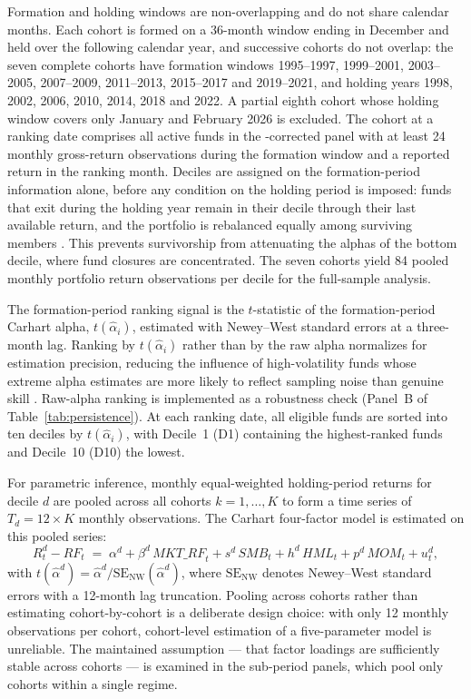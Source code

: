 \documentclass[12pt, oneside]{report}
\renewcommand{\mathrm}[1]{\text{#1}}%
\begin{document}
Formation and holding windows are non-overlapping and do not share
calendar months. Each cohort is formed on a 36-month window ending in
December and held over the following calendar year, and successive cohorts
do not overlap: the seven complete cohorts have formation windows
1995--1997, 1999--2001, 2003--2005, 2007--2009, 2011--2013, 2015--2017 and
2019--2021, and holding years 1998, 2002, 2006, 2010, 2014, 2018 and 2022.
A partial eighth cohort whose holding window covers only January and
February 2026 is excluded. The cohort at a ranking date comprises all
active funds in the \textcite{Evans2010}-corrected panel with at least 24
monthly gross-return observations during the formation window and a
reported return in the ranking month. Deciles
are assigned on the formation-period information alone, before
any condition on the holding period is imposed: funds that exit during
the holding year remain in their decile through their last available
return, and the portfolio is rebalanced equally among surviving members
\parencite{Carhart1997,KosowskiTimmermannWermersWhite2006}. This prevents
survivorship from attenuating the alphas of the bottom decile, where
fund closures are concentrated. The seven cohorts yield 84 pooled
monthly portfolio return observations per decile for the full-sample
analysis.

The formation-period ranking signal is the $t$-statistic of the
formation-period Carhart alpha, $t(\hat{\alpha}_i)$, estimated with
Newey--West standard errors at a three-month lag. Ranking by
$t(\hat{\alpha}_i)$ rather than by the raw alpha normalizes for
estimation precision, reducing the influence of high-volatility funds
whose extreme alpha estimates are more likely to reflect sampling noise
than genuine skill \parencite{KosowskiTimmermannWermersWhite2006}.
Raw-alpha ranking is implemented as a robustness check (Panel~B of
Table~\ref{tab:persistence}). At each ranking date, all eligible funds
are sorted into ten deciles by $t(\hat{\alpha}_i)$, with Decile~1 (D1)
containing the highest-ranked funds and Decile~10 (D10) the lowest.

For parametric inference, monthly equal-weighted holding-period returns
for decile $d$ are pooled across all cohorts $k = 1, \ldots, K$ to form a
time series of $T_d = 12 \times K$ monthly observations. The Carhart
four-factor model is estimated on this pooled series:
\begin{equation}
  R^d_t - RF_t \;=\; \alpha^d + \beta^d\,\mathit{MKT\_RF}_t
    + s^d\,\mathit{SMB}_t + h^d\,\mathit{HML}_t
    + p^d\,\mathit{MOM}_t + u^d_t,
  \label{eq:persistence_pooled}
\end{equation}
with $t(\hat{\alpha}^d) = \hat{\alpha}^d / \mathrm{SE}_{\mathrm{NW}}(\hat{\alpha}^d)$,
where $\mathrm{SE}_{\mathrm{NW}}$ denotes Newey--West standard errors with
a 12-month lag truncation. Pooling across cohorts rather than estimating
cohort-by-cohort is a deliberate design choice: with only 12 monthly
observations per cohort, cohort-level estimation of a five-parameter
model is unreliable. The maintained assumption --- that factor loadings
are sufficiently stable across cohorts --- is examined in the sub-period
panels, which pool only cohorts within a single regime.
\end{document}
